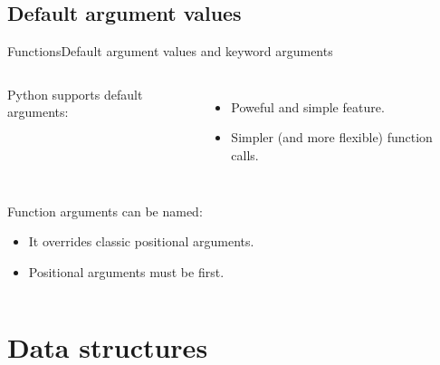 \documentclass[10pt,compress]{beamer} %
\begin{document}
\subsection{Default argument values}
\begin{frame}{Functions}{Default argument values and keyword arguments}
    \begin{columns}
	Python supports default arguments:
		\begin{itemize}
		\item Poweful and simple feature.
		\item Simpler (and more flexible) function calls.
		\end{itemize}
		\vspace{-0.2cm}
		\begin{exampleblock}{}
		\vspace{-0.2cm}
		
		\vspace{-0.2cm}
		\end{exampleblock}
	\end{columns}
	Function arguments can be named:
		\begin{itemize}
		\item It overrides classic positional arguments.
		\item Positional arguments must be first.
		\end{itemize}
		\vspace{-0.2cm}
    \begin{columns}
		\begin{exampleblock}{}
		\vspace{-0.2cm}
		
		\vspace{-0.2cm}
		\end{exampleblock}

	\column{0.6\textwidth}
		\begin{exampleblock}{}
		\vspace{-0.2cm}
		
		\vspace{-0.2cm}
		\end{exampleblock}
	\end{columns}
\end{frame}


\section{Data structures}
\end{document}
